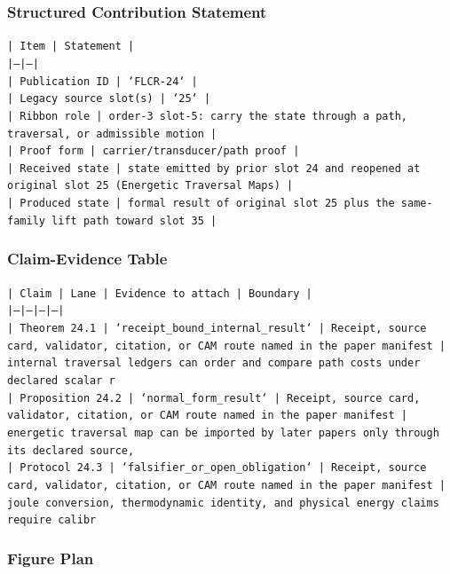 \documentclass[11pt]{article}
\begin{document}
\subsubsection*{Structured Contribution Statement}

\noindent\texttt{| Item | Statement |}\\
\noindent\texttt{|---|---|}\\
\noindent\texttt{| Publication ID | `FLCR-24` |}\\
\noindent\texttt{| Legacy source slot(s) | `25` |}\\
\noindent\texttt{| Ribbon role | order-3 slot-5: carry the state through a path, traversal, or admissible motion |}\\
\noindent\texttt{| Proof form | carrier/transducer/path proof |}\\
\noindent\texttt{| Received state | state emitted by prior slot 24 and reopened at original slot 25 (Energetic Traversal Maps) |}\\
\noindent\texttt{| Produced state | formal result of original slot 25 plus the same-family lift path toward slot 35 |}\\

\subsubsection*{Claim-Evidence Table}

\noindent\texttt{| Claim | Lane | Evidence to attach | Boundary |}\\
\noindent\texttt{|---|---|---|---|}\\
\noindent\texttt{| Theorem 24.1 | `receipt\_bound\_internal\_result` | Receipt, source card, validator, citation, or CAM route named in the paper manifest | internal traversal ledgers can order and compare path costs under declared scalar r}\\
\noindent\texttt{| Proposition 24.2 | `normal\_form\_result` | Receipt, source card, validator, citation, or CAM route named in the paper manifest | energetic traversal map can be imported by later papers only through its declared source, }\\
\noindent\texttt{| Protocol 24.3 | `falsifier\_or\_open\_obligation` | Receipt, source card, validator, citation, or CAM route named in the paper manifest | joule conversion, thermodynamic identity, and physical energy claims require calibr}\\

\subsubsection*{Figure Plan}
\end{document}
